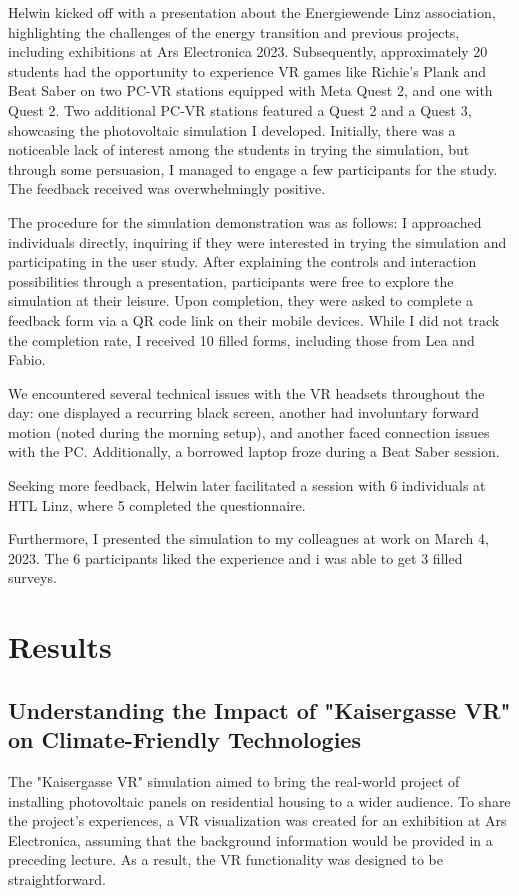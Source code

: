 \documentclass[draft, final]{vutinfth} %
\begin{document}
Helwin kicked off with a presentation about the Energiewende Linz association, highlighting the challenges of the energy transition and previous projects, including exhibitions at Ars Electronica 2023. Subsequently, approximately 20 students had the opportunity to experience VR games like Richie's Plank and Beat Saber on two PC-VR stations equipped with Meta Quest 2, and one with Quest 2. Two additional PC-VR stations featured a Quest 2 and a Quest 3, showcasing the photovoltaic simulation I developed. Initially, there was a noticeable lack of interest among the students in trying the simulation, but through some persuasion, I managed to engage a few participants for the study. The feedback received was overwhelmingly positive.

The procedure for the simulation demonstration was as follows: I approached individuals directly, inquiring if they were interested in trying the simulation and participating in the user study. After explaining the controls and interaction possibilities through a presentation, participants were free to explore the simulation at their leisure. Upon completion, they were asked to complete a feedback form via a QR code link on their mobile devices. While I did not track the completion rate, I received 10 filled forms, including those from Lea and Fabio.

We encountered several technical issues with the VR headsets throughout the day: one displayed a recurring black screen, another had involuntary forward motion (noted during the morning setup), and another faced connection issues with the PC. Additionally, a borrowed laptop froze during a Beat Saber session.

Seeking more feedback, Helwin later facilitated a session with 6 individuals at HTL Linz, where 5 completed the questionnaire.

Furthermore, I presented the simulation to my colleagues at work on March 4, 2023. The 6 participants liked the experience and i was able to get 3 filled surveys.

\chapter{Results}
\section{Understanding the Impact of "Kaisergasse VR" on Climate-Friendly Technologies}
The "Kaisergasse VR" simulation aimed to bring the real-world project of installing photovoltaic panels on residential housing to a wider audience. To share the project's experiences, a VR visualization was created for an exhibition at Ars Electronica, assuming that the background information would be provided in a preceding lecture. As a result, the VR functionality was designed to be straightforward.
\end{document}

